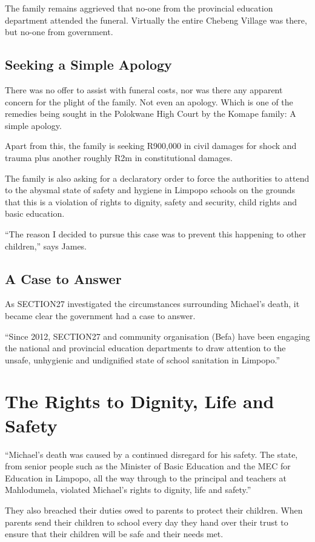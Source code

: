 \documentclass[12pt,a4paper]{article}
\begin{document}
The family remains aggrieved that no-one from the provincial education department attended the funeral. Virtually the entire Chebeng Village was there, but no-one from government.

\subsection*{Seeking a Simple Apology}
There was no offer to assist with funeral costs, nor was there any apparent concern for the plight of the family. Not even an apology. Which is one of the remedies being sought in the Polokwane High Court by the Komape family: A simple apology.

Apart from this, the family is seeking R900,000 in civil damages for shock and trauma plus another roughly R2m in constitutional damages.

The family is also asking for a declaratory order to force the authorities to attend to the abysmal state of safety and hygiene in Limpopo schools on the grounds that this is a violation of rights to dignity, safety and security, child rights and basic education.

``The reason I decided to pursue this case was to prevent this happening to other children,'' says James.

\subsection*{A Case to Answer}
As SECTION27 investigated the circumstances surrounding Michael's death, it became clear the government had a case to answer.

``Since 2012, SECTION27 and community organisation (Befa) have been engaging the national and provincial education departments to draw attention to the unsafe, unhygienic and undignified state of school sanitation in Limpopo.''


\section*{The Rights to Dignity, Life and Safety}
``Michael's death was caused by a continued disregard for his safety. The state, from senior people such as the Minister of Basic Education and the MEC for Education in Limpopo, all the way through to the principal and teachers at Mahlodumela, violated Michael’s rights to dignity, life and safety.''

They also breached their duties owed to parents to protect their children. When parents send their children to school every day they hand over their trust to ensure that their children will be safe and their needs met.
\end{document}
